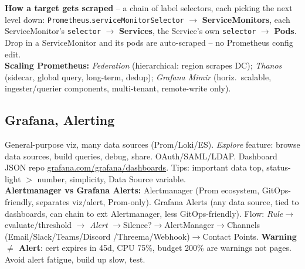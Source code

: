 \textbf{How a target gets scraped} -- a chain of label selectors, each picking the next level down: \texttt{Prometheus}.\texttt{serviceMonitorSelector} $\to$ \textbf{ServiceMonitors}, each ServiceMonitor's \texttt{selector} $\to$ \textbf{Services}, the Service's own \texttt{selector} $\to$ \textbf{Pods}. Drop in a ServiceMonitor and its pods are auto-scraped -- no Prometheus config edit. \\
\textbf{Scaling Prometheus:} \textit{Federation} (hierarchical: region scrapes DC); \textit{Thanos} (sidecar, global query, long-term, dedup); \textit{Grafana Mimir} (horiz.\ scalable, ingester/querier components, multi-tenant, remote-write only).

\subsection{Grafana, Alerting}
General-purpose viz, many data sources (Prom/Loki/ES). \textit{Explore} feature: browse data sources, build queries, debug, share. OAuth/SAML/LDAP. Dashboard JSON repo \url{grafana.com/grafana/dashboards}. Tips: important data top, status-light $>$ number, simplicity, Data Source variable. \\
\textbf{Alertmanager vs Grafana Alerts:} Alertmanager (Prom ecosystem, GitOps-friendly, separates viz/alert, Prom-only). Grafana Alerts (any data source, tied to dashboards, can chain to ext Alertmanager, less GitOps-friendly). Flow: \textit{Rule}$ \rightarrow$ evaluate/threshold $\rightarrow$ \textit{Alert} $\rightarrow$Silence?$\rightarrow$AlertManager$\rightarrow$Channels (Email/Slack/Teams/Discord /Threema/Webhook)$\rightarrow$Contact Points. \textbf{Warning $\ne$ Alert}: cert expires in 45d, CPU 75\%, budget 200\% are warnings not pages. Avoid alert fatigue, build up slow, test.

